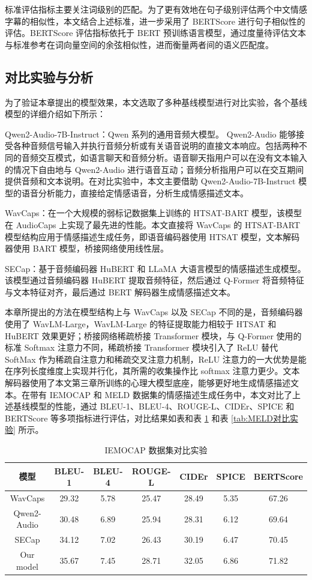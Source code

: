 标准评估指标主要关注词级别的匹配。为了更有效地在句子级别评估两个中文情感字幕的相似性，本文结合上述标准，进一步采用了 BERTScore 进行句子相似性的评估。BERTScore 评估指标依托于 BERT 预训练语言模型，通过度量待评估文本与标准参考在词向量空间的余弦相似性，进而衡量两者间的语义匹配度。

\subsection{对比实验与分析}

为了验证本章提出的模型效果，本文选取了多种基线模型进行对比实验，各个基线模型的详细介绍如下所示：

Qwen2-Audio-7B-Instruct：Qwen 系列的通用音频大模型。 Qwen2-Audio 能够接受各种音频信号输入并执行音频分析或有关语音说明的直接文本响应。包括两种不同的音频交互模式，如语言聊天和音频分析。语音聊天指用户可以在没有文本输入的情况下自由地与 Qwen2-Audio 进行语音互动；音频分析指用户可以在交互期间提供音频和文本说明。在对比实验中，本文主要借助 Qwen2-Audio-7B-Instruct 模型的语音分析能力，直接给定情感语音，分析生成情感描述文本。

WavCaps：在一个大规模的弱标记数据集上训练的 HTSAT-BART 模型，该模型在 AudioCaps 上实现了最先进的性能。本文直接将 WavCaps 的 HTSAT-BART 模型结构应用于情感描述生成任务，即语音编码器使用 HTSAT 模型，文本解码器使用 BART 模型，桥接网络使用线性层。

SECap：基于音频编码器 HuBERT 和 LLaMA 大语言模型的情感描述生成模型。该模型通过音频编码器 HuBERT 提取音频特征，然后通过 Q-Former 将音频特征与文本特征对齐，最后通过 BERT 解码器生成情感描述文本。

本章所提出的方法在模型结构上与 WavCaps 以及 SECap 不同的是，音频编码器使用了 WavLM-Large，WavLM-Large 的特征提取能力相较于 HTSAT 和 HuBERT 效果更好；桥接网络稀疏桥接 Transformer 模块，与 Q-Former 使用的标准 Softmax 注意力不同，稀疏桥接 Transformer 模块引入了 ReLU 替代 SoftMax 作为稀疏自注意力和稀疏交叉注意力机制，ReLU 注意力的一大优势是能在序列长度维度上实现并行化，其所需的收集操作比 softmax 注意力更少。文本解码器使用了本文第三章所训练的心理大模型底座，能够更好地生成情感描述文本。在带有 IEMOCAP 和 MELD 数据集的情感描述生成任务中，本文对比了上述基线模型的性能，通过 BLEU-1、BLEU-4、ROUGE-L、CIDEr、SPICE 和 BERTScore 等多项指标进行评估，对比结果如表和表 \ref{tab:IEMOCAP对比实验} 和表 \ref{tab:MELD对比实验} 所示。

\begin{table}
  \centering
  \caption{IEMOCAP 数据集对比实验}
  \label{tab:IEMOCAP对比实验}
  \begin{tabular}{ccccccc}
    \toprule
    模型 & BLEU-1 & BLEU-4 & ROUGE-L & CIDEr & SPICE & BERTScore \\
    \midrule
    WavCaps & 29.32 & 5.78 & 25.47 & 28.49 & 5.35 & 67.26 \\
    Qwen2-Audio & 30.48 & 6.89 & 25.94 & 28.31 & 6.12 & 69.64 \\
    SECap & 34.12 & 7.02 & 26.43 & 30.19 & 6.47 & 70.45 \\
    Our model & 35.67 & 7.45 & 28.71 & 32.05 & 6.86 & 71.82 \\
    \bottomrule
  \end{tabular}
\end{table}


